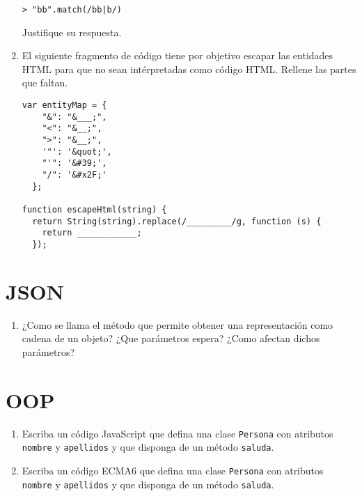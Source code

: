 \documentclass[spanish,a4paper,11pt]{article}
\begin{document}
\begin{enumerate}
\begin{verbatim}
> "bb".match(/bb|b/)

\end{verbatim}

Justifique su respuesta.
\item  El siguiente fragmento de código tiene por objetivo
escapar las entidades HTML para que no sean intérpretadas como código HTML.
Rellene las partes que faltan.
\begin{verbatim}
var entityMap = {
    "&": "&___;",
    "<": "&__;",
    ">": "&__;",
    '"': '&quot;',
    "'": '&#39;',
    "/": '&#x2F;'
  };

function escapeHtml(string) {
  return String(string).replace(/_________/g, function (s) {
    return ____________;
  });
\end{verbatim}
\end{enumerate}

\section{JSON}
\begin{enumerate}
\item
¿Como se llama el método que permite obtener una representación como cadena de un objeto?
¿Que parámetros espera? ¿Como afectan dichos parámetros?
\end{enumerate}

\section{OOP}
\begin{enumerate}
\item
Escriba un código JavaScript que defina una clase \verb|Persona| con atributos \verb|nombre|
y \verb|apellidos| y que disponga de un método \verb|saluda|.
\item 
Escriba un código ECMA6 que defina una clase \verb|Persona| con atributos \verb|nombre|
y \verb|apellidos| y que disponga de un método \verb|saluda|.
%  
%
%
%

\end{enumerate}
\end{document}

